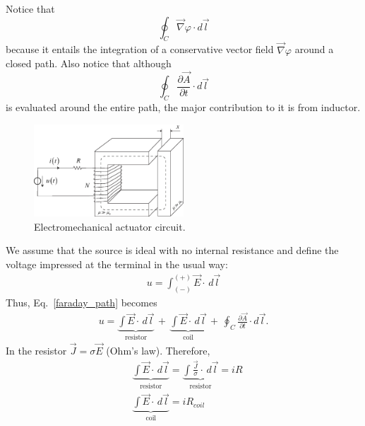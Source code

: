 \documentclass[11pt,a4paper,oneside]{book}
\numberwithin{equation}{section}
\theoremstyle{it}
\theoremstyle{definition}
\begin{document}
Notice that $$\oint_{C}\vec{\nabla}\varphi\cdot d\vec{l}$$ because it entails the integration of a conservative vector field $\vec{\nabla}\varphi$ around a closed path. Also notice that although $$\oint_{C} \frac{\partial \vec{A}}{\partial t}\cdot d\vec{l}$$ is evaluated around the entire path, the major contribution to it is from inductor.
\begin{figure}[H]
	\centering
	\includegraphics[width = 0.5\textwidth, width = 250pt, angle = 0, keepaspectratio]{figures/generic_electromecanical_actuator.eps}
	\captionsetup{width=0.75\textwidth}		
	\caption{Electromechanical actuator circuit.}
	\label{elect_mech_actuator}
\end{figure}
We assume that the source is ideal with no internal resistance and define the voltage impressed at the terminal in the usual way:
\begin{equation}\label{faraday_path_1}
	\begin{aligned}
		u=\int_{(-)}^{(+)}\vec{E}\cdot\,d\vec{l}
	\end{aligned}
\end{equation} 
Thus, Eq.~\eqref{faraday_path} becomes 
\begin{equation}\label{faraday_path_2}
	\begin{aligned}
		u= \underbrace{\int\vec{E}\cdot\,d\vec{l}}_{\text{resistor}} \, + \,
		\underbrace{\int\vec{E}\cdot\,d\vec{l}}_{\text{coil}}\, + \, \oint_{C} \frac{\partial \vec{A}}{\partial t}\cdot d\vec{l}.
	\end{aligned}
\end{equation} 
In the resistor $\vec{J}=\sigma\vec{E}$ (Ohm's law). Therefore,
\begin{equation}\label{faraday_path_3}
	\begin{aligned}
		&\underbrace{\int\vec{E}\cdot\,d\vec{l}}_{\text{resistor}}  = \underbrace{\int\frac{\vec{J}}{\sigma}\cdot\,d\vec{l}}_{\text{resistor}} = i R \\[8pt]
		&\underbrace{\int\vec{E}\cdot\,d\vec{l}}_{\text{coil}}= i R_{coil}
	\end{aligned}
\end{equation} 
\end{document}
